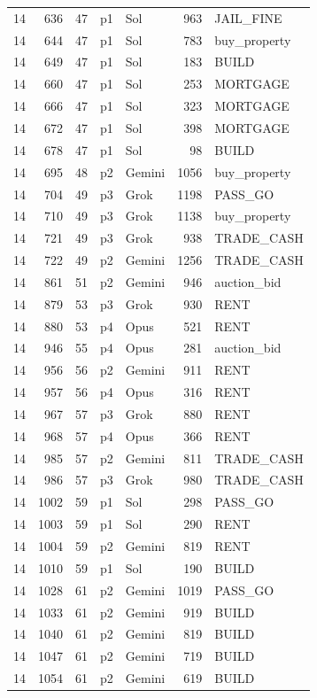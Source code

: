 \begin{longtable}{r r r l l r L{2.2in}}
14 & 636 & 47 & p1 & Sol & 963 & JAIL\_FINE \\
14 & 644 & 47 & p1 & Sol & 783 & buy\_property \\
14 & 649 & 47 & p1 & Sol & 183 & BUILD \\
14 & 660 & 47 & p1 & Sol & 253 & MORTGAGE \\
14 & 666 & 47 & p1 & Sol & 323 & MORTGAGE \\
14 & 672 & 47 & p1 & Sol & 398 & MORTGAGE \\
14 & 678 & 47 & p1 & Sol & 98 & BUILD \\
14 & 695 & 48 & p2 & Gemini & 1056 & buy\_property \\
14 & 704 & 49 & p3 & Grok & 1198 & PASS\_GO \\
14 & 710 & 49 & p3 & Grok & 1138 & buy\_property \\
14 & 721 & 49 & p3 & Grok & 938 & TRADE\_CASH \\
14 & 722 & 49 & p2 & Gemini & 1256 & TRADE\_CASH \\
14 & 861 & 51 & p2 & Gemini & 946 & auction\_bid \\
14 & 879 & 53 & p3 & Grok & 930 & RENT \\
14 & 880 & 53 & p4 & Opus & 521 & RENT \\
14 & 946 & 55 & p4 & Opus & 281 & auction\_bid \\
14 & 956 & 56 & p2 & Gemini & 911 & RENT \\
14 & 957 & 56 & p4 & Opus & 316 & RENT \\
14 & 967 & 57 & p3 & Grok & 880 & RENT \\
14 & 968 & 57 & p4 & Opus & 366 & RENT \\
14 & 985 & 57 & p2 & Gemini & 811 & TRADE\_CASH \\
14 & 986 & 57 & p3 & Grok & 980 & TRADE\_CASH \\
14 & 1002 & 59 & p1 & Sol & 298 & PASS\_GO \\
14 & 1003 & 59 & p1 & Sol & 290 & RENT \\
14 & 1004 & 59 & p2 & Gemini & 819 & RENT \\
14 & 1010 & 59 & p1 & Sol & 190 & BUILD \\
14 & 1028 & 61 & p2 & Gemini & 1019 & PASS\_GO \\
14 & 1033 & 61 & p2 & Gemini & 919 & BUILD \\
14 & 1040 & 61 & p2 & Gemini & 819 & BUILD \\
14 & 1047 & 61 & p2 & Gemini & 719 & BUILD \\
14 & 1054 & 61 & p2 & Gemini & 619 & BUILD \\

\end{longtable}
